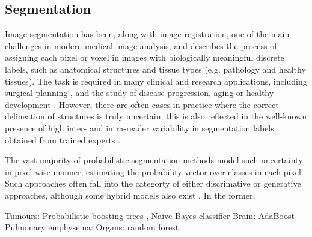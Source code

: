%

\subsection{Segmentation}
Image segmentation has been, along with image registration, one of the main challenges in modern medical image analysis, and describes the process of assigning each pixel or voxel in images with biologically meaningful discrete labels, such as anatomical structures and tissue types (e.g. pathology and healthy tissues). The task is required in many clinical and research applications, including surgical planning \cite{gering2001integrated,mazzara2004brain}, and the study of disease progression, aging or healthy development \cite{fischl2002whole,prastawa2005automatic,zijdenbos2002automatic}. However, there are often cases in practice where the correct delineation of structures is truly uncertain; this is also reflected in the well-known presence of high inter- and intra-reader variability in segmentation labels obtained from trained experts \cite{warfield2004simultaneous,joskowicz2018automatic,joskowicz2019inter}. 

The vast majority of probabilistic segmentation methods model such uncertainty in pixel-wise manner, estimating the probability vector over classes in each pixel. Such approaches often fall into the categorty of either discrimative or generative approaches, although some hybrid models also exist \cite{heckemann2006automatic,tu2008brain,iglesias2011combining,criminisi2011discriminative}. In the former,  

Tumours: Probabilistic boosting trees \cite{wels2008discriminative}, Naive Bayes classifier 
Brain: AdaBoost \cite{morra2008automatic}
Pulmonary emphysema: \cite{prasad2008multi}
Organs: random forest \cite{criminisi2009decision}



